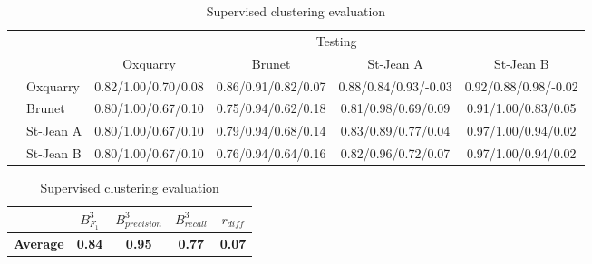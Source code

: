 \begin{table}
  \centering
  \caption{Supervised clustering evaluation}
  \label{tab:supervised_clustering}

  \label{tab:supervised_clustering_train_test}
  \begin{tabular}{l l| c c c c}
    \toprule
    \multicolumn{2}{c}{\multirow{2}{*}{}} & \multicolumn{4}{c}{Testing} \\
    \multicolumn{2}{c}{} & Oxquarry & Brunet & St-Jean A & St-Jean B \\
    \midrule
    \parbox[t]{2mm}{}
    & Oxquarry
    & 0.82/1.00/0.70/0.08
    & 0.86/0.91/0.82/0.07
    & 0.88/0.84/0.93/-0.03
    & 0.92/0.88/0.98/-0.02 \\
    & Brunet
    & 0.80/1.00/0.67/0.10
    & 0.75/0.94/0.62/0.18
    & 0.81/0.98/0.69/0.09
    & 0.91/1.00/0.83/0.05 \\
    & St-Jean A
    & 0.80/1.00/0.67/0.10
    & 0.79/0.94/0.68/0.14
    & 0.83/0.89/0.77/0.04
    & 0.97/1.00/0.94/0.02 \\
    & St-Jean B
    & 0.80/1.00/0.67/0.10
    & 0.76/0.94/0.64/0.16
    & 0.82/0.96/0.72/0.07
    & 0.97/1.00/0.94/0.02 \\
    \bottomrule
  \end{tabular}

  \label{tab:supervised_clustering_average}
  \begin{tabular}{l c c c c}
    \toprule
    & $B^{3}_{F_1}$
    & $B^{3}_{precision}$
    & $B^{3}_{recall}$
    & $r_{diff}$ \\
    \midrule
    \textbf{Average}
    & \textbf{0.84}
    & \textbf{0.95}
    & \textbf{0.77}
    & \textbf{0.07}
    \\
    \bottomrule
  \end{tabular}
\end{table}
